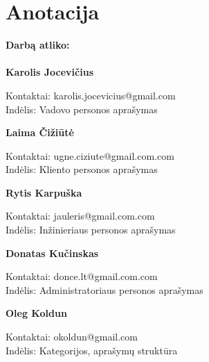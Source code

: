 

\newcommand{\anotacijaIndelis}[3]{
	\textbf{#1}
	\begin{flushleft}
	\hspace*{1cm}
	Kontaktai: #2
	\\
	\hspace*{1cm}
	Indėlis: #3
	\end{flushleft}
}

\newcommand{\anotacija}[2]{
	\textbf{#1}
	\begin{flushleft}
	\hspace*{1cm}
	Kontaktai: #2
	\end{flushleft}
}

\section*{Anotacija}
	
		\textbf{Darbą atliko:}\\\\
		\anotacijaIndelis{Karolis Jocevičius}{karolis.jocevicius@gmail.com}{Vadovo personos aprašymas}
		
		\anotacijaIndelis{Laima Čižiūtė}{ugne.ciziute@gmail.com.com}{Kliento personos aprašymas}
		
		\anotacijaIndelis{Rytis Karpuška}{jauleris@gmail.com.com}{Inžinieriaus personos aprašymas}

		\anotacijaIndelis{Donatas Kučinskas}{donce.lt@gmail.com.com}{Administratoriaus personos aprašymas}

		\anotacijaIndelis{Oleg Koldun}{okoldun@gmail.com}{Kategorijos, aprašymų struktūra}